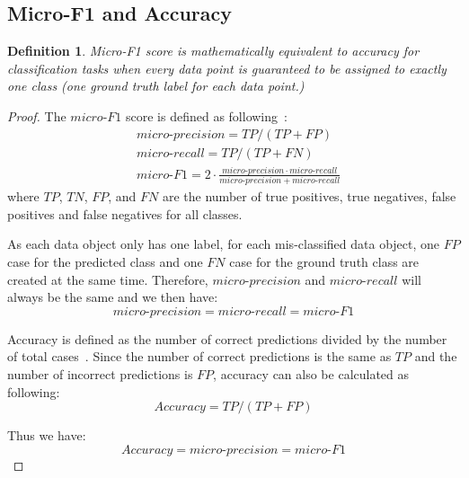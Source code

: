 \documentclass[letterpaper]{article} \usepackage{aaai21}  \usepackage{times}  \usepackage{helvet} \usepackage{courier}  \usepackage[hyphens]{url}  \usepackage{graphicx} \urlstyle{rm} \def\UrlFont{\rm}  \usepackage{natbib}  \usepackage{caption} \frenchspacing  \setlength{\pdfpagewidth}{8.5in}  \setlength{\pdfpageheight}{11in}
\newtheorem{dfn}{Definition}
\begin{document}
\subsection{Micro-F1 and Accuracy}
\label{appn:proof2}
\begin{dfn}
Micro-F1 score is mathematically equivalent to accuracy for classification tasks when every data point is guaranteed to be assigned to exactly one class (one ground truth label for each data point.)
\end{dfn}


\begin{proof}

The $micro$-$F1$ score is defined as following~\cite{han2011data}: 
\begin{equation}
\begin{aligned}
    &micro\mbox{-}precision = TP / (TP + FP) \\
    &micro\mbox{-}recall = TP / (TP + FN) \\
    &micro\mbox{-}F1 = 2 \cdot \frac{micro\mbox{-}precision \cdot micro\mbox{-}recall}{micro\mbox{-}precision + micro\mbox{-}recall}
\end{aligned}
\end{equation}
where $TP$, $TN$, $FP$, and $FN$ are the number of true positives, true negatives, false positives and false negatives for all classes. 

As each data object only has one label, for each mis-classified data object, one $FP$ case for the predicted class and one $FN$ case for the ground truth class are created at the same time. Therefore, $micro$-$precision$ and $micro$-$recall$ will always be the same and we then have:
\begin{equation}
    micro\mbox{-}precision = micro\mbox{-}recall = micro\mbox{-}F1
\end{equation}

Accuracy is defined as the number of correct predictions divided by the number of total cases~\cite{han2011data}. Since the number of correct predictions is the same as $TP$ and the number of incorrect predictions is $FP$, accuracy can also be calculated as following:
\begin{equation}
Accuracy = TP / (TP + FP)
\end{equation}

Thus we have:
\begin{equation}
Accuracy = micro\mbox{-}precision = micro\mbox{-}F1
\end{equation}

\end{proof}
\end{document}
